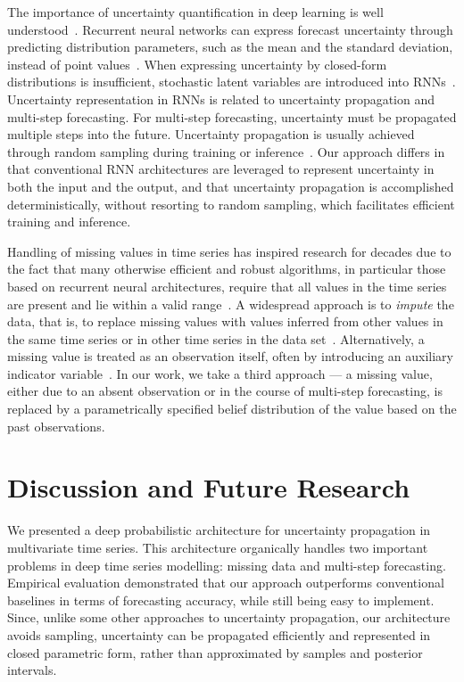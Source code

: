 \documentclass[runningheads]{llncs}
\begin{document}
The importance of uncertainty quantification in deep learning is
well understood~\cite{MFS+21}.  Recurrent neural networks can
express forecast uncertainty through predicting distribution
parameters, such as the mean and the standard deviation, instead
of point values~\cite{HS97}. When expressing uncertainty by closed-form
distributions is insufficient, stochastic latent
variables are introduced into RNNs~\cite{YB21,CKD+15,FSK+16}. 
Uncertainty representation in RNNs is related to uncertainty
propagation and multi-step forecasting. For multi-step
forecasting, uncertainty must be propagated multiple steps into
the future. Uncertainty propagation is usually achieved through
random sampling during training or inference~\cite{LYY+19,AV20,YB21}. 
Our approach differs in that conventional RNN architectures are
leveraged to represent uncertainty in both the input and
the output, and that uncertainty propagation is accomplished
deterministically, without resorting to random sampling, which
facilitates efficient training and inference.

Handling of missing values in time series has inspired research
for decades due to the fact that many otherwise efficient and
robust algorithms, in particular those based on recurrent neural
architectures, require that all values in the time series
are present and lie within a valid range~\cite{WSY+21}. A
widespread approach is to \textit{impute} the data,
that is, to replace missing values with values inferred from
other values in the same time series or in other time series
in the data set~\cite{KC18,SYG+19}. Alternatively, a
missing value is treated as an observation itself, often by
introducing an auxiliary indicator variable~\cite{LKW16,BDS21}.
In our work, we take a third approach --- a missing value,
either due to an absent observation or in the course of
multi-step forecasting, is replaced by a parametrically
specified belief distribution of the value based on the past
observations. 

\section{Discussion and Future Research}

We presented a deep probabilistic architecture for uncertainty
propagation in multivariate time series. This architecture
organically handles two important problems in deep time series
modelling: missing data and multi-step forecasting. Empirical
evaluation demonstrated that our approach outperforms
conventional baselines in terms of forecasting accuracy, while
still being easy to implement. Since, unlike some other
approaches to uncertainty propagation, our architecture
avoids sampling, uncertainty can be propagated efficiently and
represented in closed parametric form, rather than approximated
by samples and posterior intervals.
\end{document}
